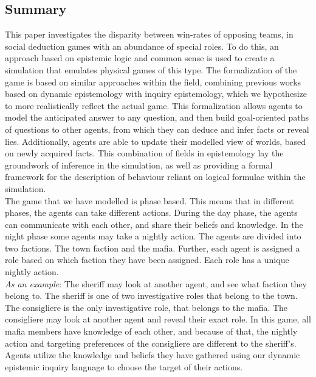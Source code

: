\onecolumn
\begin{center}
	\section*{Summary}\label{sec:summary}
\end{center}
This paper investigates the disparity between win-rates of opposing teams, in
social deduction games with an abundance of special roles. To do  this, an
approach based on epistemic logic and common sense is used to create a
simulation that emulates physical games of this type. The formalization of the
game is based on similar approaches within the field, combining previous works based on dynamic epistemology with inquiry epistemology,
which we hypothesize to more realistically reflect the actual game. This formalization allows agents to model the anticipated answer to any question, and then build goal-oriented
paths of questions to other agents, from which they can deduce and infer facts or reveal lies. Additionally, agents are able to update their modelled view of worlds, based on newly acquired facts.
This combination of fields in epistemology lay the groundwork of inference in the simulation,
as well as providing a formal framework for the description of behaviour
reliant on logical formulae within the simulation. \\
The game that we have modelled is phase based. This means that in different phases, the agents can take different actions. During the day phase, the agents can communicate with each other, and share their beliefs and knowledge. In the night phase some agents may take a nightly action. The agents are divided into two factions. The town faction and the mafia. Further, each agent is assigned a role based on which faction they have been assigned. Each role has a unique nightly action.\\ \textit{As an example}: The sheriff may look at another agent, and see what faction they belong to. The sheriff is one of two investigative roles that belong to the town. The consigliere is the only investigative role, that belongs to the mafia. The consigliere may look at another agent and reveal their exact role. In this game, all mafia members have knowledge of each other, and because of that, the nightly action and targeting preferences of the consigliere are different to the sheriff's.
Agents utilize the knowledge and beliefs they have gathered using our dynamic epistemic inquiry language to choose the target of their actions. \\
